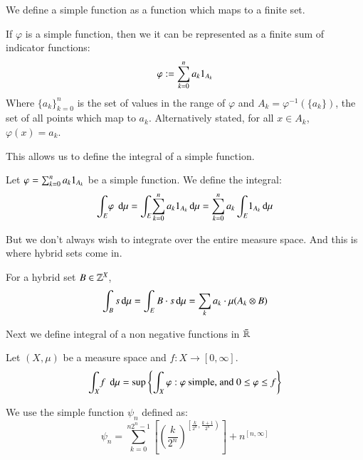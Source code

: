 We define a simple function as a function which maps to a finite set.
\begin{theorem}
	If $\varphi$ is a simple function, then we it can be represented as a finite sum of indicator functions:
	\begin{equation}
		\varphi := \sum_{k=0}^n a_k \ind[A_k]
	\end{equation}
	Where $\{ a_k \}_{k=0}^n$ is the set of values in the range of $\varphi$ and $A_k = \varphi^{-1}( \{ a_k \} )$, 
	the set of all points which map to $a_k$.
	Alternatively stated, for all $x \in A_k$, $\varphi(x) = a_k$.
\end{theorem}

This allows us to define the integral of a simple function.

\begin{definition}
	Let $\varphi = \sum_{k=0}^n a_k \ind[A_k]$ be a simple function. We define the integral:
	\begin{equation}
		\int_E \! \varphi \; \diff \mu 
		= \int_E \! \sum_{k=0}^n a_k \ind[A_k] \diff \mu 
		= \sum_{k=0}^n a_k  \int_E \! \ind[A_k] \diff \mu
	\end{equation}
\end{definition}

But we don't always wish to integrate over the entire measure space.
And this is where hybrid sets come in.

For a hybrid set $B \in \hsetover[X]$,
\begin{equation}
	\int_B s \mathop{}\!\mathrm{d} \mu = \int_E B \cdot s \mathop{}\!\mathrm{d} \mu = \sum_k a_k \cdot \mu(A_k \otimes B)
\end{equation}


Next we define integral of a non negative functions in $\bar{\mathbb{R}}$

\begin{definition}
	Let $(X,\mu)$ be a measure space and $f: X \to [0,\infty]$. 
	\begin{equation}
		\int_X \! f \; \mathop{}\!\mathrm{d}\mu = \text{sup} \left\{ \int_X \varphi : \varphi \text{ simple, and } 0 \leq \varphi \leq f \right\}
	\end{equation}
\end{definition}

We use the simple function $\psi_n$ defined as:
\begin{equation}
	\psi_n = \sum_{k=0}^{n2^n -1} 
		\left[ \left(\frac{k}{2^n}\right)^{\left[ \frac{k}{2^n}, \frac{k+1}{2^n} \right)} \right] 
		+ n^{[n,\infty]}
\end{equation}

